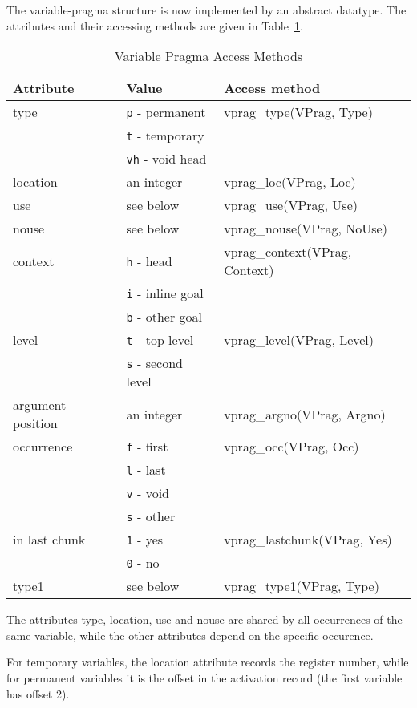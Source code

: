 The variable-pragma structure is now implemented by an abstract datatype.
The attributes and their accessing methods are given in Table~\ref{t:vprag}.

\begin{table}\centering
\begin{tabular}{|l|l|l|}
\hline
Attribute	& Value			& Access method			\\
\hline \hline
{\sf type}	& {\tt p} - permanent	& vprag\_type(VPrag, Type)	\\
		& {\tt t} - temporary	&				\\
		& {\tt vh} - void head	&				\\
{\sf location}	& an integer		& vprag\_loc(VPrag, Loc)	\\
{\sf use}	& see below		& vprag\_use(VPrag, Use)	\\
{\sf nouse}	& see below		& vprag\_nouse(VPrag, NoUse)	\\
\hline
{\sf context}	& {\tt h} - head	& vprag\_context(VPrag, Context)\\
		& {\tt i} - inline goal &				\\
		& {\tt b} - other goal	&				\\
{\sf level}	& {\tt t} - top	level	& vprag\_level(VPrag, Level)	\\
		& {\tt s} - second level&				\\
{\sf argument
     position}	& an integer		& vprag\_argno(VPrag, Argno)	\\
{\sf occurrence}& {\tt f} - first	& vprag\_occ(VPrag, Occ)	\\
		& {\tt l} - last	& 				\\
		& {\tt v} - void	& 				\\
		& {\tt s} - other	& 				\\
{\sf in last
     chunk}	& {\tt 1} - yes		& vprag\_lastchunk(VPrag, Yes)	\\
		& {\tt 0} - no		&				\\
\hline
{\sf type1}	& see below		& vprag\_type1(VPrag, Type)     \\
\hline
\end{tabular}
\caption{Variable Pragma Access Methods}
\label{t:vprag}
\end{table}

The attributes {\sf type, location, use} and {\sf nouse} are shared
by all occurrences of the same variable, while the other attributes
depend on the specific occurence.

For temporary variables, the {\sf location} attribute records the
register number, while for permanent variables it is the offset in
the activation record (the first variable has offset 2).

